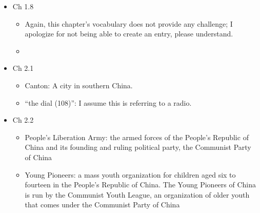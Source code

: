 \documentclass[12pt]{article}
\newcommand{\vc}[4]{
  \item Ch #1.#2
  \begin{itemize}
    \item #3
    \item #4
  \end{itemize}
}
\begin{document}
\begin{itemize}
  \vc{1}{8}{Again, this chapter's vocabulary does not provide any challenge; I apologize for not being able to create an entry, please understand.}{}

  \vc{2}{1}{Canton: A city in southern China.}{``the dial (108)'': I assume this is referring to a radio.}

  \vc{2}{2}{People's Liberation Army: the armed forces of the People's Republic of China and its founding and ruling political party, the Communist Party of China}{Young Pioneers: a mass youth organization for children aged six to fourteen in the People's Republic of China. The Young Pioneers of China is run by the Communist Youth League, an organization of older youth that comes under the Communist Party of China}
\end{itemize}
\end{document}

